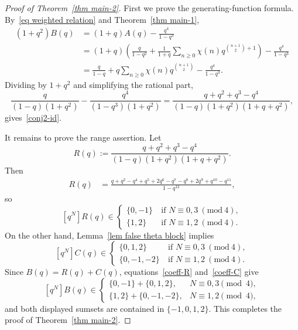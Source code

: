 \documentclass[reqno]{amsart}
\theoremstyle{definition}
\theoremstyle{plain}
\theoremstyle{remark}
\numberwithin{equation}{section}
\newcommand{\Mod}[1]{\ (\mathrm{mod}\ #1)}
\begin{document}
\begin{proof}[Proof of Theorem~\ref{thm main-2}]
First we prove the generating-function formula. By~\eqref{eq weighted relation} and Theorem~\ref{thm main-1},
\begin{align*}
(1+q^2)B(q)
&=(1+q)A(q)-\frac{q^4}{1-q^3}\\
&=(1+q)\left(\frac{q}{1-q^2}+\frac{1}{1+q}\sum_{n\ge 0}\chi(n)q^{\binom{n+1}{2}+1}\right)-\frac{q^4}{1-q^3}\\
&=\frac{q}{1-q}+q\sum_{n\ge 0}\chi(n)q^{\binom{n+1}{2}}-\frac{q^4}{1-q^3}.
\end{align*}
Dividing by $1+q^2$ and simplifying the rational part,
\[
\frac{q}{(1-q)(1+q^2)}-\frac{q^4}{(1-q^3)(1+q^2)}
=\frac{q+q^2+q^3-q^4}{(1-q)(1+q^2)(1+q+q^2)},
\]
gives~\eqref{conj2-id}.

It remains to prove the range assertion.  Let
\[
R(q):= \frac{q+q^2+q^3-q^4}{(1-q)(1+q^2)(1+q+q^2)}.
\]
Then
\begin{align*}
R(q)
&=\frac{q+q^2-q^4+q^5+2q^6-q^7-q^8+2q^9+q^{10}-q^{11}}{1-q^{12}},
\end{align*}
so
\begin{equation}\label{coeff-R}
[q^N] R(q)
\in\begin{cases}
\{0,-1\} &\ \text{if\ } N\equiv 0,3\Mod{4}, \\
\{1,2\} & \ \text{if\ } N\equiv 1,2\Mod{4}.
\end{cases}
\end{equation}
On the other hand, Lemma~\ref{lem false theta block} implies
\begin{equation}\label{coeff-C}
[q^N] C(q)
\in\begin{cases}
\{0,1,2\} &\ \text{if\ } N\equiv 0,3\Mod{4}, \\
\{0,-1,-2\} &\ \text{if\ } N\equiv 1,2\Mod{4}.
\end{cases}
\end{equation}
Since $B(q)=R(q)+C(q)$, equations~\eqref{coeff-R} and~\eqref{coeff-C} give
\[
[q^N]B(q)\in
\begin{cases}
\{0,-1\}+\{0,1,2\}, & N\equiv 0,3\pmod 4,\\
\{1,2\}+\{0,-1,-2\}, & N\equiv 1,2\pmod 4,
\end{cases}
\]
and both displayed sumsets are contained in $\{-1,0,1,2\}$.  This completes the proof of Theorem~\ref{thm main-2}.
\end{proof}
\end{document}
